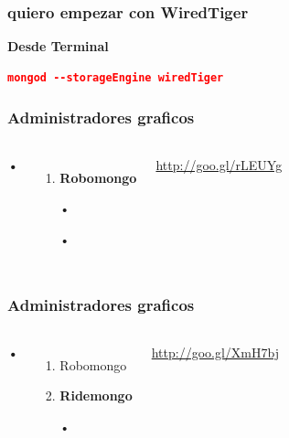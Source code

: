 \documentclass{beamer}
\begin{document}
\begin{frame}[fragile] %
\frametitle{quiero empezar con WiredTiger}
\textbf{Desde Terminal}
\begin{lstlisting}[language=json,firstnumber=1]
mongod --storageEngine wiredTiger
\end{lstlisting}
\end{frame}


\begin{frame}
\frametitle{Administradores graficos}
\begin{columns}[c] %

\textbf{•}
\begin{enumerate}
\item \textbf{Robomongo}
\item[•]
\item[•]
\end{enumerate}

{\color{blue}\url{http://goo.gl/rLEUYg}}
\end{columns}

\end{frame}

\begin{frame}
\frametitle{Administradores graficos}
\begin{columns}[c] %

\textbf{•}
\begin{enumerate}
\item Robomongo
\item \textbf{Ridemongo}
\item[•]
\end{enumerate}

{\color{blue}\url{http://goo.gl/XmH7bj}}
\end{columns}
\end{frame}
\end{document}
